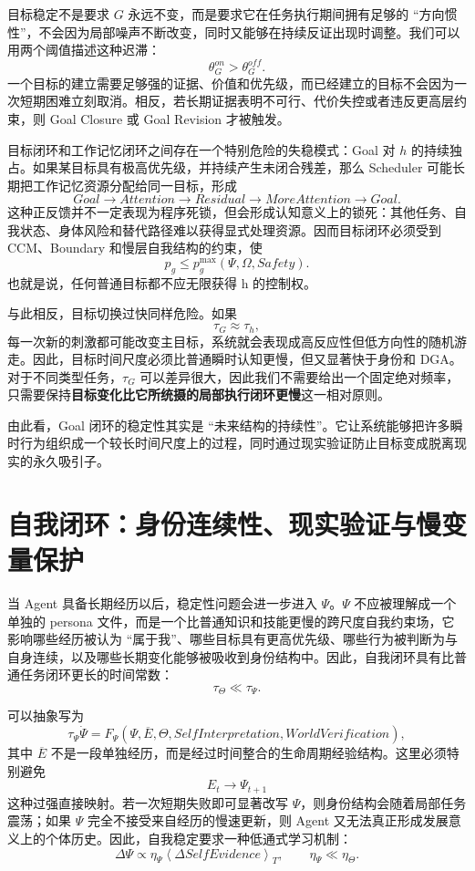 目标稳定不是要求 $G$ 永远不变，而是要求它在任务执行期间拥有足够的 ``方向惯性''，不会因为局部噪声不断改变，同时又能够在持续反证出现时调整。我们可以用两个阈值描述这种迟滞：
\[
\theta_G^{on}
>
\theta_G^{off}.
\]
一个目标的建立需要足够强的证据、价值和优先级，而已经建立的目标不会因为一次短期困难立刻取消。相反，若长期证据表明不可行、代价失控或者违反更高层约束，则 Goal Closure 或 Goal Revision 才被触发。

目标闭环和工作记忆闭环之间存在一个特别危险的失稳模式：Goal 对 $h$ 的持续独占。如果某目标具有极高优先级，并持续产生未闭合残差，那么 Scheduler 可能长期把工作记忆资源分配给同一目标，形成
\[
Goal
\rightarrow
Attention
\rightarrow
Residual
\rightarrow
MoreAttention
\rightarrow
Goal.
\]
这种正反馈并不一定表现为程序死锁，但会形成认知意义上的锁死：其他任务、自我状态、身体风险和替代路径难以获得显式处理资源。因而目标闭环必须受到 CCM、Boundary 和慢层自我结构的约束，使
\[
p_g
\leq
p_g^{\max}(\Psi,\Omega,Safety).
\]
也就是说，任何普通目标都不应无限获得 h 的控制权。

与此相反，目标切换过快同样危险。如果
\[
\tau_G\approx\tau_h,
\]
每一次新的刺激都可能改变主目标，系统就会表现成高反应性但低方向性的随机游走。因此，目标时间尺度必须比普通瞬时认知更慢，但又显著快于身份和 DGA。对于不同类型任务，$\tau_G$ 可以差异很大，因此我们不需要给出一个固定绝对频率，只需要保持\textbf{目标变化比它所统摄的局部执行闭环更慢}这一相对原则。

由此看，Goal 闭环的稳定性其实是 ``未来结构的持续性''。它让系统能够把许多瞬时行为组织成一个较长时间尺度上的过程，同时通过现实验证防止目标变成脱离现实的永久吸引子。

\section{自我闭环：身份连续性、现实验证与慢变量保护}

当 Agent 具备长期经历以后，稳定性问题会进一步进入 $\Psi$。$\Psi$ 不应被理解成一个单独的 persona 文件，而是一个比普通知识和技能更慢的跨尺度自我约束场，它影响哪些经历被认为 ``属于我''、哪些目标具有更高优先级、哪些行为被判断为与自身连续，以及哪些长期变化能够被吸收到身份结构中。因此，自我闭环具有比普通任务闭环更长的时间常数：
\[
\tau_\Theta
\ll
\tau_\Psi.
\]

可以抽象写为
\[
\tau_\Psi\dot\Psi
=
F_\Psi
\left(
\Psi,
\overline E,
\Theta,
SelfInterpretation,
WorldVerification
\right),
\]
其中 $\overline E$ 不是一段单独经历，而是经过时间整合的生命周期经验结构。这里必须特别避免
\[
E_t\rightarrow\Psi_{t+1}
\]
这种过强直接映射。若一次短期失败即可显著改写 $\Psi$，则身份结构会随着局部任务震荡；如果 $\Psi$ 完全不接受来自经历的慢速更新，则 Agent 又无法真正形成发展意义上的个体历史。因此，自我稳定要求一种低通式学习机制：
\[
\Delta\Psi
\propto
\eta_\Psi
\left\langle
\Delta SelfEvidence
\right\rangle_T,
\qquad
\eta_\Psi\ll\eta_\Theta.
\]

